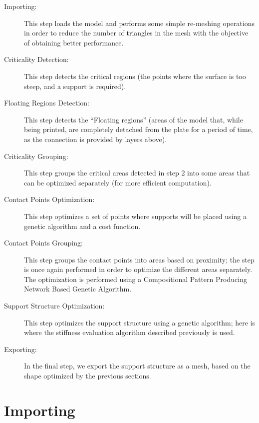 \begin{description}
    \item [ Importing: ] This step loads the model and performs some simple re-meshing operations in order
    to reduce the number of triangles in the mesh with the objective of obtaining better performance.
    \item [ Criticality Detection: ] This step detects the critical regions (the points where the
    surface is too steep, and a support is required).
    \item [ Floating Regions Detection: ] This step detects the ``Floating regions'' (areas
    of the model that, while being printed, are completely detached from the plate for a period of time,
    as the connection is provided by layers above).
    \item [ Criticality Grouping: ] This step groups the critical areas detected in step 2 into
    some areas that can be optimized separately (for more efficient computation).
    \item [ Contact Points Optimization: ] This step optimizes a set of points where
    supports will be placed using a genetic algorithm and a cost function.
    \item [ Contact Points Grouping: ] This step groups the contact points into areas based on proximity; the step is once again performed in order to optimize the different areas separately.
    The optimization is performed using a Compositional Pattern Producing Network Based Genetic Algorithm.
    \item [ Support Structure Optimization: ] This step optimizes the support structure using a genetic
    algorithm; here is where the stiffness evaluation algorithm described previously is used.
    \item [ Exporting: ] In the final step, we export the support structure as a mesh, based
    on the shape optimized by the previous sections.
\end{description}


\section{Importing}
\label{sec:importing}

